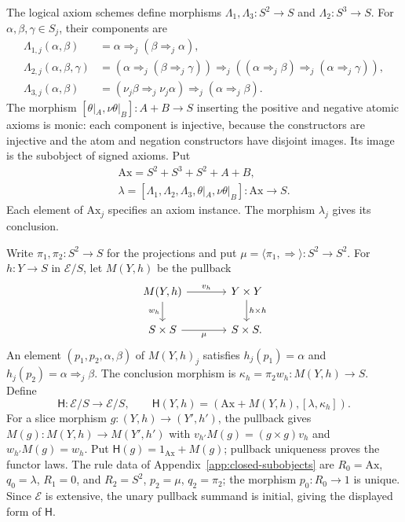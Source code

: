 The logical axiom schemes define morphisms
$\Lambda_1,\Lambda_3:S^2\to S$ and $\Lambda_2:S^3\to S$.
For $\alpha,\beta,\gamma\in S_j$, their components are
\begin{align*}
 \Lambda_{1,j}(\alpha,\beta)
   &=\alpha\Rightarrow_j(\beta\Rightarrow_j\alpha),\\
 \Lambda_{2,j}(\alpha,\beta,\gamma)
   &=(\alpha\Rightarrow_j(\beta\Rightarrow_j\gamma))
     \Rightarrow_j((\alpha\Rightarrow_j\beta)
                         \Rightarrow_j(\alpha\Rightarrow_j\gamma)),\\
 \Lambda_{3,j}(\alpha,\beta)
   &=(\nu_j\beta\Rightarrow_j\nu_j\alpha)
                         \Rightarrow_j(\alpha\Rightarrow_j\beta).
\end{align*}
The morphism
$[\theta|_A,\nu\theta|_B]:A+B\to S$ inserting the positive and negative
atomic axioms is monic: each component is
injective, because the constructors are
injective and the atom and negation constructors have disjoint images.
Its image is the subobject of signed axioms. Put
\[
 \begin{gathered}
 \mathrm{Ax}=S^2+S^3+S^2+A+B,\\
 \lambda=[\Lambda_1,\Lambda_2,\Lambda_3,\theta|_A,\nu\theta|_B]:
                 \mathrm{Ax}\longrightarrow S.
 \end{gathered}
\]
Each element of $\mathrm{Ax}_j$ specifies an axiom instance.
The morphism $\lambda_j$ gives its conclusion.

Write $\pi_1,\pi_2:S^2\to S$ for the projections and put
$\mu=\langle\pi_1,\Rightarrow\rangle:S^2\to S^2$.
For $h:Y\to S$ in $\mathcal E/S$, let $M(Y,h)$ be the pullback
\[
\begin{tikzcd}[column sep=large]
 M(Y,h)\arrow[r,"v_h"]\arrow[d,"w_h"'] &
 Y\times Y\arrow[d,"h\times h"]\\
 S\times S\arrow[r,"\mu"'] & S\times S.
\end{tikzcd}
\]
An element $(p_1,p_2,\alpha,\beta)$ of $M(Y,h)_j$ satisfies
$h_j(p_1)=\alpha$ and $h_j(p_2)=\alpha\Rightarrow_j\beta$.
The conclusion morphism is
$\kappa_h=\pi_2w_h:M(Y,h)\to S$. Define
\[
 \mathsf H:\mathcal E/S\longrightarrow\mathcal E/S,
 \qquad
 \mathsf H(Y,h)=
       (\mathrm{Ax}+M(Y,h),[\lambda,\kappa_h]).
\]
For a slice morphism $g:(Y,h)\to(Y',h')$, the pullback gives
$M(g):M(Y,h)\to M(Y',h')$ with
$v_{h'}M(g)=(g\times g)v_h$ and $w_{h'}M(g)=w_h$.
Put $\mathsf H(g)=1_{\mathrm{Ax}}+M(g)$; pullback uniqueness
proves the functor laws. The rule data of
Appendix~\ref{app:closed-subobjects} are
$R_0=\mathrm{Ax}$, $q_0=\lambda$, $R_1=0$, and
$R_2=S^2$, $p_2=\mu$, $q_2=\pi_2$; the morphism $p_0:R_0\to1$
is unique. Since $\mathcal E$ is extensive, the unary pullback
summand is initial, giving the displayed form of $\mathsf H$.

